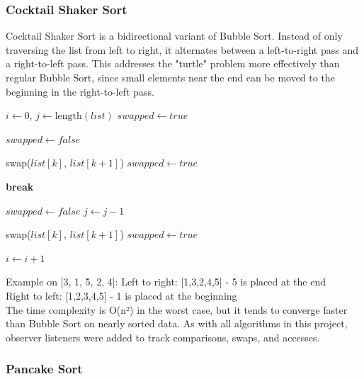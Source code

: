 \documentclass{article}
\begin{document}
\subsubsection{Cocktail Shaker Sort}

Cocktail Shaker Sort is a bidirectional variant of Bubble Sort. Instead of only traversing the list from left to right, it alternates between a left-to-right pass and a right-to-left pass. This addresses the "turtle" problem more effectively than regular Bubble Sort, since small elements near the end can be moved to the beginning in the right-to-left pass.

\begin{algorithm}[H]
\caption{Pseudocode for Cocktail Shaker Sort}
\begin{algorithmic}[1]
    \State $i \gets 0$, $j \gets \text{length}(list)$
    \State $swapped \gets true$
    
        \State $swapped \gets false$
        
                \State swap($list[k]$, $list[k+1]$)
                \State $swapped \gets true$
            \EndIf
        \EndFor
        
            \State \textbf{break}
        \EndIf
        
        \State $swapped \gets false$
        \State $j \gets j - 1$
        
                \State swap($list[k]$, $list[k+1]$)
                \State $swapped \gets true$
            \EndIf
        \EndFor
        
        \State $i \gets i + 1$
    \EndWhile
\end{algorithmic}
\end{algorithm}

Example on [3, 1, 5, 2, 4]:
Left to right: [1,3,2,4,5] - 5 is placed at the end \\
Right to left: [1,2,3,4,5] - 1 is placed at the beginning\\
The time complexity is O(n²) in the worst case, but it tends to converge faster than Bubble Sort on nearly sorted data. As with all algorithms in this project, observer listeners were added to track comparisons, swaps, and accesses.

\subsubsection{Pancake Sort}
\end{document}
